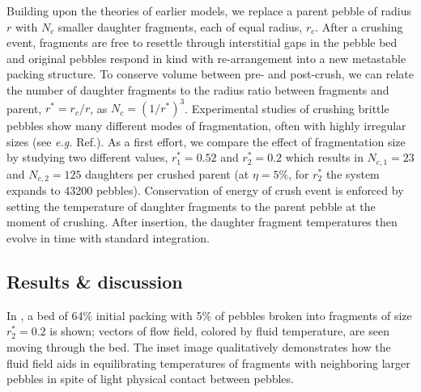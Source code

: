 Building upon the theories of earlier models, we replace a parent pebble of radius $r$ with $N_c$ smaller daughter fragments, each of equal radius, $r_c$. After a crushing event, fragments are free to resettle through interstitial gaps in the pebble bed and original pebbles respond in kind with re-arrangement into a new metastable packing structure.  To conserve volume between pre- and post-crush, we can relate the number of daughter fragments to the radius ratio between fragments and parent, $r^* = r_c/r$, as $N_c = (1/r^*)^{3}$. Experimental studies of crushing brittle pebbles show many different modes of fragmentation, often with highly irregular sizes (see \textit{e.g.} Ref.\cite{Wu2004}). As a first effort, we compare the effect of fragmentation size by studying two different values, $r^*_1 = 0.52$ and $r^*_2 = 0.2$ which results in $N_{c,1} = 23$ and $N_{c,2} = 125$ daughters per crushed parent (at $\eta = 5\%$, for $r_2^*$ the system expands to \num{43200} pebbles). Conservation of energy of crush event is enforced by setting the temperature of daughter fragments to the parent pebble at the moment of crushing. After insertion, the daughter fragment temperatures then evolve in time with standard integration.







\subsection{Results \& discussion}
In , a bed of 64\% initial packing with 5\% of pebbles broken into fragments of size $r_2^* = 0.2$ is shown; vectors of flow field, colored by fluid temperature, are seen moving through the bed. The inset image qualitatively demonstrates how the fluid field aids in equilibrating temperatures of fragments with neighboring larger pebbles in spite of light physical contact between pebbles. 

